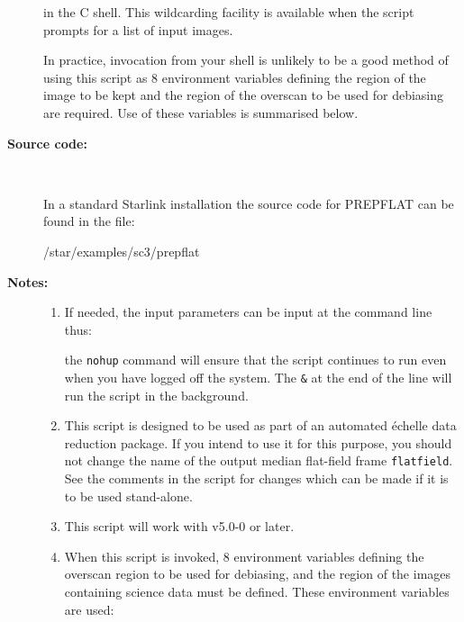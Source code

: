 \documentclass[twoside,11pt]{starlink}
\begin{document}
\begin{description}
\begin{terminalv}
\end{terminalv}

     in the C shell.  This wildcarding facility is available when the
     script prompts for a list of input images.

     In practice, invocation from your shell is unlikely to be a good
     method of using this script as 8 environment variables defining
     the region of the image to be kept and the region of the overscan
     to be used for debiasing are required.  Use of these variables is
     summarised below.

\item [\textbf{Source code:}] \mbox{} \\
\begin{latexonly}
In a standard Starlink installation the source code for PREPFLAT can be found
in the file:
\begin{terminalv}
   /star/examples/sc3/prepflat
\end{terminalv}
\end{latexonly}



\item [\textbf{Notes:}] \mbox{}
\begin{enumerate}
\item If needed, the input parameters can be input at the command
      line thus:

\begin{terminalv}
\end{terminalv}

      the \verb+nohup+ command will ensure that the script continues
      to run even when you have logged off the system.  The \verb+&+ at
      the end of the line will run the script in the background.

\item This script is designed to be used as part of an automated
      \'{e}chelle data reduction package.  If you intend to use it
      for this purpose, you should not change the name of the output
      median flat-field frame \verb+flatfield+.  See the comments in the
      script for changes which can be made if it is to be used
      stand-alone.

\item This script will work with  v5.0-0 or later.

\item When this script is invoked, 8 environment variables defining
      the overscan region to be used for debiasing, and the region
      of the images containing science data must be defined.
      These environment variables are used:


\end{enumerate}
\end{description}
\end{document}
